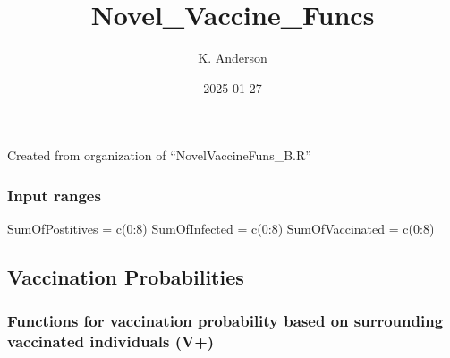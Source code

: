 \documentclass[
]{article}
\title{Novel\_Vaccine\_Funcs}
\author{K. Anderson}
\date{2025-01-27}
\newenvironment{Shaded}{\begin{snugshade}}{\end{snugshade}}
\newcommand{\DecValTok}[1]{\textcolor[rgb]{0.00,0.00,0.81}{#1}}
\newcommand{\FunctionTok}[1]{\textcolor[rgb]{0.00,0.00,0.00}{#1}}
\newcommand{\NormalTok}[1]{#1}
\newcommand{\OtherTok}[1]{\textcolor[rgb]{0.56,0.35,0.01}{#1}}
\newcommand{\SpecialCharTok}[1]{\textcolor[rgb]{0.00,0.00,0.00}{#1}}
\begin{document}
\maketitle

Created from organization of ``NovelVaccineFuns\_B.R''

\hypertarget{input-ranges}{%
\subsubsection{Input ranges}\label{input-ranges}}

\begin{Shaded}
\begin{Highlighting}[]
\NormalTok{SumOfPostitives }\OtherTok{=} \FunctionTok{c}\NormalTok{(}\DecValTok{0}\SpecialCharTok{:}\DecValTok{8}\NormalTok{)}
\NormalTok{SumOfInfected }\OtherTok{=} \FunctionTok{c}\NormalTok{(}\DecValTok{0}\SpecialCharTok{:}\DecValTok{8}\NormalTok{)}
\NormalTok{SumOfVaccinated }\OtherTok{=} \FunctionTok{c}\NormalTok{(}\DecValTok{0}\SpecialCharTok{:}\DecValTok{8}\NormalTok{)}
\end{Highlighting}
\end{Shaded}

\hypertarget{vaccination-probabilities}{%
\subsection{Vaccination Probabilities}\label{vaccination-probabilities}}

\hypertarget{functions-for-vaccination-probability-based-on-surrounding-vaccinated-individuals-v}{%
\subsubsection{Functions for vaccination probability based on
surrounding vaccinated individuals
(V+)}\label{functions-for-vaccination-probability-based-on-surrounding-vaccinated-individuals-v}}
\end{document}

